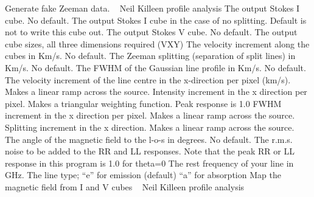 %
\noindent Generate fake Zeeman data.
\newline \ 
\newline {} Neil Killeen
\newline {} profile analysis
The output Stokes I cube. No default.
The output Stokes I cube in the case of no splitting.  Default
is not to write this cube out.
The output Stokes V cube. No default.
The output cube sizes, all three dimensions required (VXY)
The velocity increment along the cubes in Km/s. No default.
The Zeeman splitting (separation of split lines) in Km/s. No default.
\keyword{\bf FWHM}
The FWHM of the Gaussian line profile in Km/s. No default.
The velocity increment of the line centre in the x-direction 
per pixel (km/s).  Makes a linear ramp across the source.
Intensity increment in the x direction per pixel. Makes
a triangular weighting function.  Peak response is 1.0
FWHM increment in the x direction per pixel.  Makes
a linear ramp across the source.
Splitting increment in the x direction.  Makes a linear ramp
across the source.
The angle of the magnetic field to the l-o-s in degrees. No default.
\keyword{\bf NOISE}
The r.m.s. noise to be added to the RR and LL responses. Note
that the peak RR or LL response in this program is 1.0 for theta=0
\keyword{\bf RESTFREQ}
The rest frequency of your line in GHz.
The line type; ``e'' for emission (default) ``a'' for absorption
\module{zeemap}%
\noindent Map the magnetic field from I and V cubes
\newline \ 
\newline {} Neil Killeen
\newline {} profile analysis
